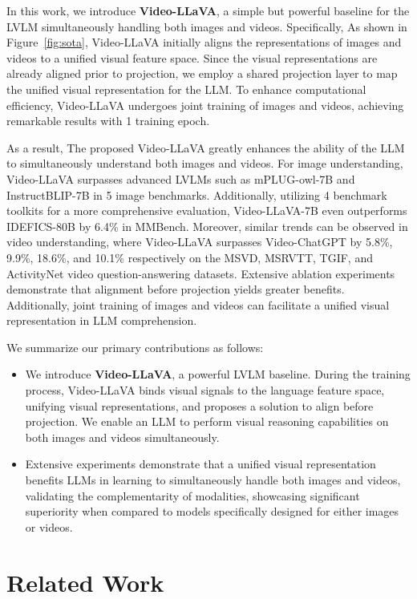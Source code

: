 In this work, we introduce \textbf{Video-LLaVA}, a simple but powerful baseline for the LVLM simultaneously handling both images and videos. Specifically, As shown in Figure~\ref{fig:sota}, Video-LLaVA initially aligns the representations of images and videos to a unified visual feature space. Since the visual representations are already aligned prior to projection, we employ a shared projection layer to map the unified visual representation for the LLM. To enhance computational efficiency, Video-LLaVA undergoes joint training of images and videos, achieving remarkable results with 1 training epoch. 

As a result, The proposed Video-LLaVA greatly enhances the ability of the LLM to simultaneously understand both images and videos. For image understanding, Video-LLaVA surpasses advanced LVLMs such as mPLUG-owl-7B and InstructBLIP-7B in 5 image benchmarks. Additionally, utilizing 4 benchmark toolkits for a more comprehensive evaluation, Video-LLaVA-7B even outperforms IDEFICS-80B by 6.4\% in MMBench. Moreover, similar trends can be observed in video understanding, where Video-LLaVA surpasses Video-ChatGPT by 5.8\%, 9.9\%, 18.6\%, and 10.1\% respectively on the MSVD, MSRVTT, TGIF, and ActivityNet video question-answering datasets. Extensive ablation experiments demonstrate that alignment before projection yields greater benefits. Additionally, joint training of images and videos can facilitate a unified visual representation in LLM comprehension.

We summarize our primary contributions as follows:
\begin{itemize}
\item We introduce \textbf{Video-LLaVA}, a powerful LVLM baseline. During the training process, Video-LLaVA binds visual signals to the language feature space, unifying visual representations, and proposes a solution to align before projection. We enable an LLM to perform visual reasoning capabilities on both images and videos simultaneously.
\item Extensive experiments demonstrate that a unified visual representation benefits LLMs in learning to simultaneously handle both images and videos, validating the complementarity of modalities, showcasing significant superiority when compared to models specifically designed for either images or videos.
\end{itemize}

\section{Related Work}
\label{sec:related}

